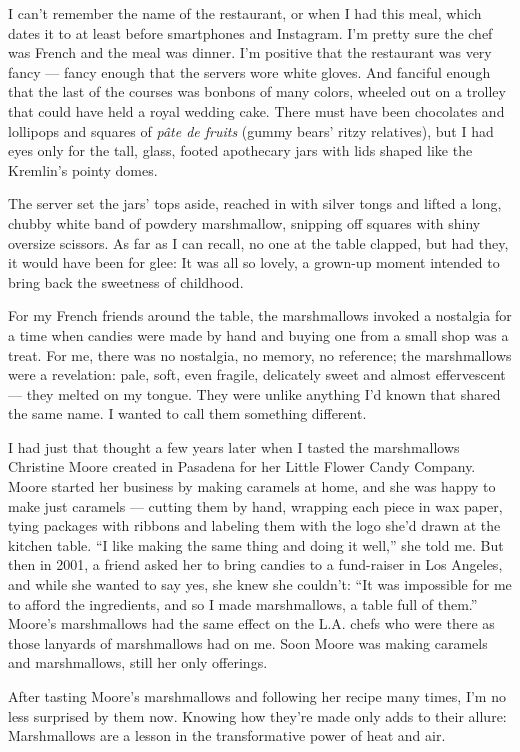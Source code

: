 I can't remember the name of the restaurant, or when I had this meal,
which dates it to at least before smartphones and Instagram. I'm pretty
sure the chef was French and the meal was dinner. I'm positive that the
restaurant was very fancy --- fancy enough that the servers wore white
gloves. And fanciful enough that the last of the courses was bonbons of
many colors, wheeled out on a trolley that could have held a royal
wedding cake. There must have been chocolates and lollipops and squares
of \emph{pâte de fruits} (gummy bears' ritzy relatives), but I had eyes
only for the tall, glass, footed apothecary jars with lids shaped like
the Kremlin's pointy domes.

The server set the jars' tops aside, reached in with silver tongs and
lifted a long, chubby white band of powdery marshmallow, snipping off
squares with shiny oversize scissors. As far as I can recall, no one at
the table clapped, but had they, it would have been for glee: It was all
so lovely, a grown-up moment intended to bring back the sweetness of
childhood.

For my French friends around the table, the marshmallows invoked a
nostalgia for a time when candies were made by hand and buying one from
a small shop was a treat. For me, there was no nostalgia, no memory, no
reference; the marshmallows were a revelation: pale, soft, even fragile,
delicately sweet and almost effervescent --- they melted on my tongue.
They were unlike anything I'd known that shared the same name. I wanted
to call them something different.

I had just that thought a few years later when I tasted the marshmallows
Christine Moore created in Pasadena for her Little Flower Candy Company.
Moore started her business by making caramels at home, and she was happy
to make just caramels --- cutting them by hand, wrapping each piece in
wax paper, tying packages with ribbons and labeling them with the logo
she'd drawn at the kitchen table. ``I like making the same thing and
doing it well,'' she told me. But then in 2001, a friend asked her to
bring candies to a fund-raiser in Los Angeles, and while she wanted to
say yes, she knew she couldn't: ``It was impossible for me to afford the
ingredients, and so I made marshmallows, a table full of them.'' Moore's
marshmallows had the same effect on the L.A. chefs who were there as
those lanyards of marshmallows had on me. Soon Moore was making caramels
and marshmallows, still her only offerings.

After tasting Moore's marshmallows and following her recipe many times,
I'm no less surprised by them now. Knowing how they're made only adds to
their allure: Marshmallows are a lesson in the transformative power of
heat and air.

